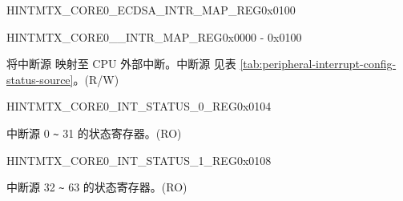\begin{register}{H}{INTMTX\_CORE0\_ECDSA\_INTR\_MAP\_REG}{0x0100}\label{regdesc:INTMTXCORE0ECDSAINTRMAPREG}
\end{register}\vspace{-3em}

\begin{register}{H}{INTMTX\_CORE0\_\_INTR\_MAP\_REG}{0x0000 - 0x0100}\label{INTMTXCORE0SOURCEINTRMAPREG}
%
%
\regnewline%
\begin{regdesc}\begin{reglist}
\label{INTMTXCORE0SOURCEINTRMAP}\item [INTMTX\_CORE0\_\regindex{SOURCE}\_INTR\_MAP] 将中断源  映射至 CPU 外部中断。中断源  见表 \ref{tab:peripheral-interrupt-config-status-source}。(R/W)
\end{reglist}\end{regdesc}
\end{register}

\begin{register}{H}{INTMTX\_CORE0\_INT\_STATUS\_0\_REG}{0x0104}\label{regdesc:INTMTXCORE0INTSTATUS0REG}
%
\regnewline%
\begin{regdesc}\begin{reglist}
\label{fielddesc:INTMTXCORE0INTSTATUS0}\item [INTMTX\_CORE0\_INT\_STATUS\_0] 中断源 0 \verb+~+ 31 的状态寄存器。(RO)
\end{reglist}\end{regdesc}
\end{register}


\begin{register}{H}{INTMTX\_CORE0\_INT\_STATUS\_1\_REG}{0x0108}\label{regdesc:INTMTXCORE0INTSTATUS1REG}
%
\regnewline%
\begin{regdesc}\begin{reglist}
\label{fielddesc:INTMTXCORE0INTSTATUS1}\item [INTMTX\_CORE0\_INT\_STATUS\_1] 中断源 32 \verb+~+ 63 的状态寄存器。(RO)
\end{reglist}\end{regdesc}
\end{register}


